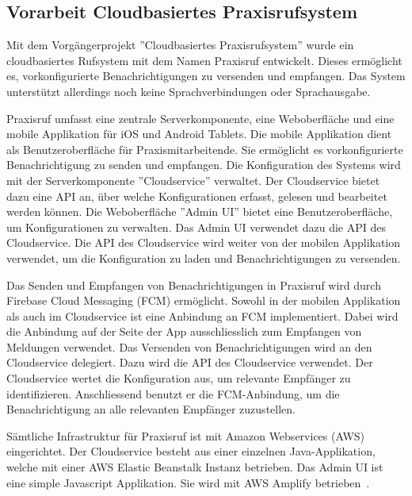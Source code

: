 \subsection{Vorarbeit Cloudbasiertes Praxisrufsystem}

Mit dem Vorgängerprojekt ''Cloudbasiertes Praxisrufsystem'' wurde ein cloudbasiertes Rufsystem mit dem Namen Praxisruf entwickelt.
Dieses ermöglicht es, vorkonfigurierte Benachrichtigungen zu versenden und empfangen.
Das System unterstützt allerdings noch keine Sprachverbindungen oder Sprachausgabe.

Praxisruf umfasst eine zentrale Serverkomponente, eine Weboberfläche und eine mobile Applikation für iOS und Android Tablets.
Die mobile Applikation dient als Benutzeroberfläche für Praxismitarbeitende.
Sie ermöglicht es vorkonfigurierte Benachrichtigung zu senden und empfangen.
Die Konfiguration des Systems wird mit der Serverkomponente ''Cloudservice'' verwaltet.
Der Cloudservice bietet dazu eine API an, über welche Konfigurationen erfasst, gelesen und bearbeitet werden können.
Die Weboberfläche ''Admin UI'' bietet eine Benutzeroberfläche, um Konfigurationen zu verwalten.
Das Admin UI verwendet dazu die API des Cloudservice.
Die API des Cloudservice wird weiter von der mobilen Applikation verwendet, um die Konfiguration zu laden und Benachrichtigungen zu versenden.

Das Senden und Empfangen von Benachrichtigungen in Praxisruf wird durch Firebase Cloud Messaging (FCM) ermöglicht.
Sowohl in der mobilen Applikation als auch im Cloudservice ist eine Anbindung an FCM implementiert.
Dabei wird die Anbindung auf der Seite der App ausschliesslich zum Empfangen von Meldungen verwendet.
Das Versenden von Benachrichtigungen wird an den Cloudservice delegiert.
Dazu wird die API des Cloudservice verwendet.
Der Cloudservice wertet die Konfiguration aus, um relevante Empfänger zu identifizieren.
Anschliessend benutzt er die FCM-Anbindung, um die Benachrichtigung an alle relevanten Empfänger zuzustellen.

Sämtliche Infrastruktur für Praxisruf ist mit Amazon Webservices (AWS) eingerichtet.
Der Cloudservice besteht aus einer einzelnen Java-Applikation, welche mit einer AWS Elastic Beanstalk Instanz betrieben.
Das Admin UI ist eine simple Javascript Applikation.
Sie wird mit AWS Amplify betrieben~\cite{ip5}.
